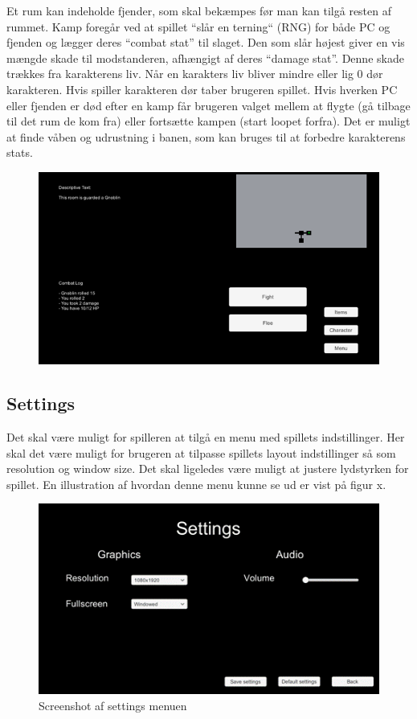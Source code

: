 Et rum kan indeholde fjender, som skal bekæmpes før man kan tilgå resten af rummet. Kamp foregår ved at spillet “slår en terning“ (RNG) for både PC og fjenden og lægger deres “combat stat” til slaget. Den som slår højest giver en vis mængde skade til modstanderen, afhængigt af deres “damage stat”. Denne skade trækkes fra karakterens liv. Når en karakters liv bliver mindre eller lig 0 dør karakteren. Hvis spiller karakteren dør taber brugeren spillet.  Hvis hverken PC eller fjenden er død efter en kamp får brugeren valget mellem at flygte (gå tilbage til det rum de kom fra) eller fortsætte kampen (start loopet forfra). 
Det er muligt at finde våben og udrustning i banen, som kan bruges til at forbedre karakterens stats. 

\begin{figure}[h]
\centering
\includegraphics[width = \textwidth]{02-Body/Images/CombatScreen-udkast.png}
\caption{}
\label{fig:Combat-udkast}
\end{figure}

\subsection{Settings}
Det skal være muligt for spilleren at tilgå en menu med spillets indstillinger. Her skal det være muligt for brugeren at tilpasse spillets layout indstillinger så som resolution og window size. Det skal ligeledes være muligt at justere lydstyrken for spillet. En illustration af hvordan denne menu kunne se ud er vist på figur x.

\begin{figure}[h]
\centering
\includegraphics[width = \textwidth]{02-Body/Images/SettingsMenu-udkast.png}
\caption{Screenshot af settings menuen}
\label{fig:Settings-udkast}
\end{figure}